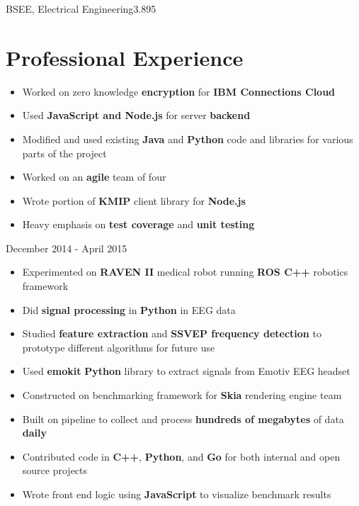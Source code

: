 \documentclass{my_resume}
\begin{document}

	{BSEE, Electrical Engineering}{3.895}

\section{Professional Experience}
\begin{itemize}
	\item Worked on zero knowledge \textbf{encryption} for 
		\textbf{IBM Connections Cloud}
	\item Used \textbf{JavaScript and Node.js} for server \textbf{backend}
	\item Modified and used existing \textbf{Java} and \textbf{Python} code
		and libraries for various parts of the project
	\item Worked on an \textbf{agile} team of four
	\item Wrote portion of \textbf{KMIP} client library for \textbf{Node.js}
    \item Heavy emphasis on \textbf{test coverage} and \textbf{unit testing}
\end{itemize}
	{December 2014 - April 2015}
\begin{itemize}
	\item Experimented on \textbf{RAVEN II} medical robot running \textbf{ROS C++}
		robotics framework
	\item Did \textbf{signal processing} in \textbf{Python} in EEG data
	\item Studied \textbf{feature extraction} and \textbf{SSVEP frequency detection}
        to prototype different algorithms for future use
	\item Used \textbf{emokit} \textbf{Python} library to extract signals from
		Emotiv EEG headset
\end{itemize}
\begin{itemize}
	\item Constructed on benchmarking framework for \textbf{Skia} rendering engine team
    \item Built on pipeline to collect and process \textbf{hundreds of megabytes}
        of data \textbf{daily}
	\item Contributed code in \textbf{C++}, \textbf{Python}, and \textbf{Go} for
		both internal and open source projects
	\item Wrote front end logic using \textbf{JavaScript} to visualize benchmark results
\end{itemize}
\end{document}
